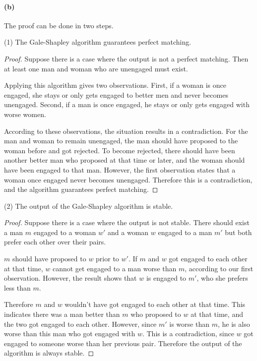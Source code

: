 \documentclass[10pt]{article}
\begin{document}
\paragraph{(b)} The proof can be done in two steps.

\vspace{0.3cm}\hspace{0.2cm}(1) The Gale-Shapley algorithm guarantees perfect matching.
\begin{proof}
    Suppose there is a case where the output is not a perfect matching. 
    Then at least one man and woman who are unengaged must exist.

    \vspace{0.3cm} Applying this algorithm gives two observations. 
    First, if a woman is once engaged, she stays or only gets engaged to better men and never becomes unengaged.
    Second, if a man is once engaged, he stays or only gets engaged with worse women.

    \vspace{0.3cm} According to these observations, the situation results in a contradiction.
    For the man and woman to remain unengaged, the man should have proposed to the woman before and got rejected.
    To become rejected, there should have been another better man who proposed at that time or later, and the woman should have been engaged to that man.
    However, the first observation states that a woman once engaged never becomes unengaged. 
    Therefore this is a contradiction, and the algorithm guarantees perfect matching.

\end{proof}
\hspace{0.2cm}(2) The output of the Gale-Shapley algorithm is stable.
\begin{proof}
    Suppose there is a case where the output is not stable. 
    There should exist a man $m$ engaged to a woman $w'$ and a woman $w$ engaged to a man $m'$ but both prefer each other over their pairs.

    \vspace{0.3cm} $m$ should have proposed to $w$ prior to $w'$. 
    If $m$ and $w$ got engaged to each other at that time, $w$ cannot get engaged to a man worse than $m$, according to our first observation.
    However, the result shows that $w$ is engaged to $m'$, who she prefers less than $m$. 

    \vspace{0.3cm} Therefore $m$ and $w$ wouldn't have got engaged to each other at that time.
    This indicates there was a man better than $m$ who proposed to $w$ at that time, and the two got engaged to each other.
    However, since $m'$ is worse than $m$, he is also worse than this man who got engaged with $w$.
    This is a contradiction, since $w$ got engaged to someone worse than her previous pair.
    Therefore the output of the algorithm is always stable.

\end{proof}
\end{document}
